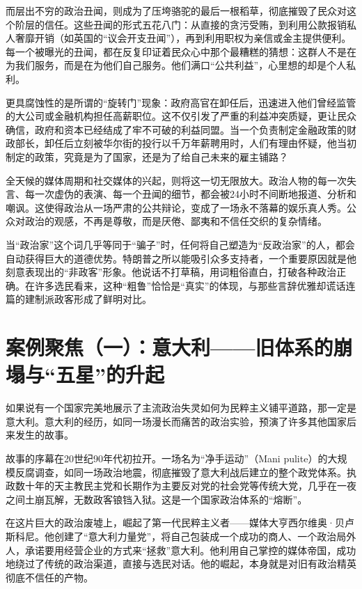 而层出不穷的政治丑闻，则成为了压垮骆驼的最后一根稻草，彻底摧毁了民众对这个阶层的信任。这些丑闻的形式五花八门：从直接的贪污受贿，到利用公款报销私人奢靡开销（如英国的“议会开支丑闻”），再到利用职权为亲信或金主提供便利。每一个被曝光的丑闻，都在反复印证着民众心中那个最糟糕的猜想：这群人不是在为我们服务，而是在为他们自己服务。他们满口“公共利益”，心里想的却是个人私利。

更具腐蚀性的是所谓的“旋转门”现象：政府高官在卸任后，迅速进入他们曾经监管的大公司或金融机构担任高薪职位。这不仅引发了严重的利益冲突质疑，更让民众确信，政府和资本已经结成了牢不可破的利益同盟。当一个负责制定金融政策的财政部长，卸任后立刻被华尔街的投行以千万年薪聘用时，人们有理由怀疑，他当初制定的政策，究竟是为了国家，还是为了给自己未来的雇主铺路？

全天候的媒体周期和社交媒体的兴起，则将这一切无限放大。政治人物的每一次失言、每一次虚伪的表演、每一个丑闻的细节，都会被24小时不间断地报道、分析和嘲讽。这使得政治从一场严肃的公共辩论，变成了一场永不落幕的娱乐真人秀。公众对政治的观感，不再是尊敬，而是厌倦、鄙夷和不信任交织的复杂情绪。

当“政治家”这个词几乎等同于“骗子”时，任何将自己塑造为“反政治家”的人，都会自动获得巨大的道德优势。特朗普之所以能吸引众多支持者，一个重要原因就是他刻意表现出的“非政客”形象。他说话不打草稿，用词粗俗直白，打破各种政治正确。在许多选民看来，这种“粗鲁”恰恰是“真实”的体现，与那些言辞优雅却谎话连篇的建制派政客形成了鲜明对比。

\section{案例聚焦（一）：意大利——旧体系的崩塌与“五星”的升起}

如果说有一个国家完美地展示了主流政治失灵如何为民粹主义铺平道路，那一定是意大利。意大利的经历，如同一场漫长而痛苦的政治实验，预演了许多其他国家后来发生的故事。

故事的序幕在20世纪90年代初拉开。一场名为“净手运动”（Mani pulite）的大规模反腐调查，如同一场政治地震，彻底摧毁了意大利战后建立的整个政党体系。执政数十年的天主教民主党和长期作为主要反对党的社会党等传统大党，几乎在一夜之间土崩瓦解，无数政客锒铛入狱。这是一个国家政治体系的“熔断”。

在这片巨大的政治废墟上，崛起了第一代民粹主义者——媒体大亨西尔维奥·贝卢斯科尼。他创建了“意大利力量党”，将自己包装成一个成功的商人、一个政治局外人，承诺要用经营企业的方式来“拯救”意大利。他利用自己掌控的媒体帝国，成功地绕过了传统的政治渠道，直接与选民对话。他的崛起，本身就是对旧有政治精英彻底不信任的产物。

